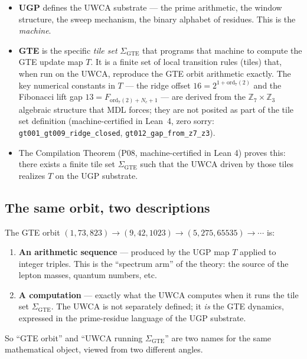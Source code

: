 \documentclass[11pt,a4paper]{article}
\begin{document}
\begin{itemize}
  \item \textbf{UGP} defines the UWCA substrate — the prime arithmetic, the
    window structure, the sweep mechanism, the binary alphabet of residues.
    This is the \emph{machine}.

  \item \textbf{GTE} is the specific \emph{tile set} $\Sigma_{\mathrm{GTE}}$
    that programs that machine to compute the GTE update map $T$.  It is a
    finite set of local transition rules (tiles) that, when run on the UWCA,
    reproduce the GTE orbit arithmetic exactly.  The key numerical constants
    in $T$ — the ridge offset $16 = 2^{1+\mathrm{ord}_7(2)}$ and the Fibonacci
    lift gap $13 = F_{\mathrm{ord}_7(2)+N_c+1}$ — are derived from the
    $\mathbb{Z}_7 \times \mathbb{Z}_3$ algebraic structure that MDL forces; they
    are not posited as part of the tile set definition (machine-certified in
    Lean~4, zero sorry: \texttt{gt001\_gt009\_ridge\_closed},
    \texttt{gt012\_gap\_from\_z7\_z3}).

  \item The Compilation Theorem (P08, machine-certified in Lean 4) proves
    this: there exists a finite tile set $\Sigma_{\mathrm{GTE}}$ such that
    the UWCA driven by those tiles realizes $T$ on the UGP substrate.
\end{itemize}

\subsection{The same orbit, two descriptions}

The GTE orbit $(1, 73, 823) \to (9, 42, 1023) \to (5, 275, 65535) \to
\cdots$ is:
\begin{enumerate}
  \item \textbf{An arithmetic sequence} — produced by the UGP map $T$ applied
    to integer triples.  This is the ``spectrum arm'' of the theory: the
    source of the lepton masses, quantum numbers, etc.
  \item \textbf{A computation} — exactly what the UWCA computes when it runs
    the tile set $\Sigma_{\mathrm{GTE}}$.  The UWCA is not separately defined;
    it \emph{is} the GTE dynamics, expressed in the prime-residue language of
    the UGP substrate.
\end{enumerate}

So ``GTE orbit'' and ``UWCA running $\Sigma_{\mathrm{GTE}}$'' are two names
for the same mathematical object, viewed from two different angles.
\end{document}
